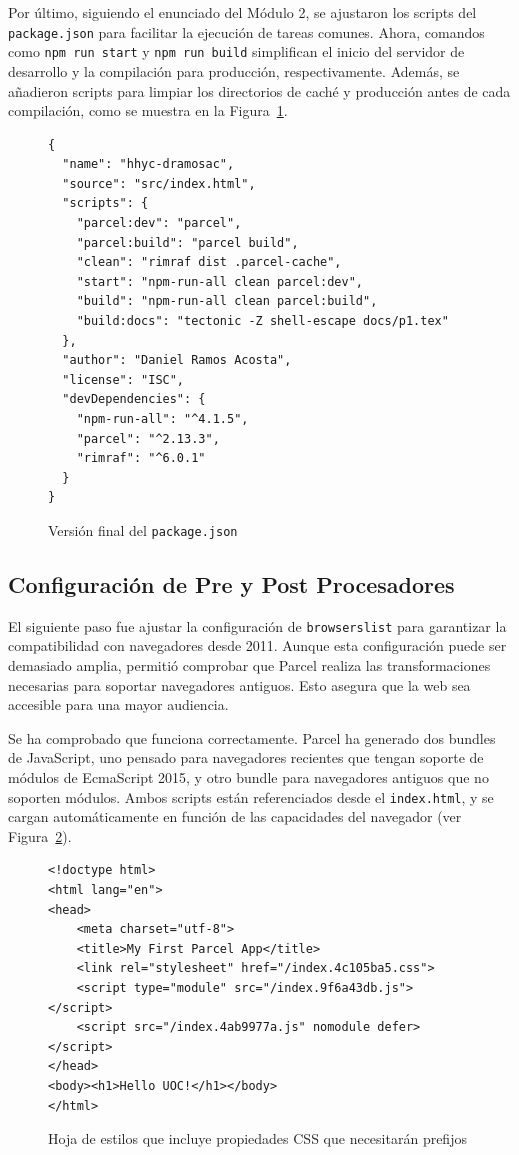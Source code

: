 \documentclass{article}
\begin{document}
Por último, siguiendo el enunciado del Módulo 2, se ajustaron los scripts del \texttt{package.json} para facilitar la ejecución de tareas comunes. Ahora, comandos como \texttt{npm run start} y \texttt{npm run build} simplifican el inicio del servidor de desarrollo y la compilación para producción, respectivamente. Además, se añadieron scripts para limpiar los directorios de caché y producción antes de cada compilación, como se muestra en la Figura~\ref{fig:package-json}.

\begin{figure}[h!]
\begin{verbatim}
{
  "name": "hhyc-dramosac",
  "source": "src/index.html",
  "scripts": {
    "parcel:dev": "parcel",
    "parcel:build": "parcel build",
    "clean": "rimraf dist .parcel-cache",
    "start": "npm-run-all clean parcel:dev",
    "build": "npm-run-all clean parcel:build",
    "build:docs": "tectonic -Z shell-escape docs/p1.tex"
  },
  "author": "Daniel Ramos Acosta",
  "license": "ISC",
  "devDependencies": {
    "npm-run-all": "^4.1.5",
    "parcel": "^2.13.3",
    "rimraf": "^6.0.1"
  }
}
\end{verbatim}
\caption{Versión final del \lstinline{package.json}}
\label{fig:package-json}
\end{figure}

\subsection{Configuración de Pre y Post Procesadores}\label{subsec:configuracion-de-pre-y-post-procesadores}

El siguiente paso fue ajustar la configuración de \texttt{browserslist} para garantizar la compatibilidad con navegadores desde 2011. Aunque esta configuración puede ser demasiado amplia, permitió comprobar que Parcel realiza las transformaciones necesarias para soportar navegadores antiguos. Esto asegura que la web sea accesible para una mayor audiencia.

Se ha comprobado que funciona correctamente. Parcel ha generado dos bundles de JavaScript, uno pensado para navegadores recientes que tengan soporte de módulos de EcmaScript 2015, y otro bundle para navegadores antiguos que no soporten módulos. Ambos scripts están referenciados desde el \texttt{index.html}, y se cargan automáticamente en función de las capacidades del navegador (ver Figura~\ref{fig:index-html}).

\begin{figure}[h!]
\begin{verbatim}
<!doctype html>
<html lang="en">
<head>
    <meta charset="utf-8">
    <title>My First Parcel App</title>
    <link rel="stylesheet" href="/index.4c105ba5.css">
    <script type="module" src="/index.9f6a43db.js"></script>
    <script src="/index.4ab9977a.js" nomodule defer></script>
</head>
<body><h1>Hello UOC!</h1></body>
</html>
\end{verbatim}
\caption{Hoja de estilos que incluye propiedades CSS que necesitarán prefijos}
\label{fig:index-html}
\end{figure}
\end{document}
